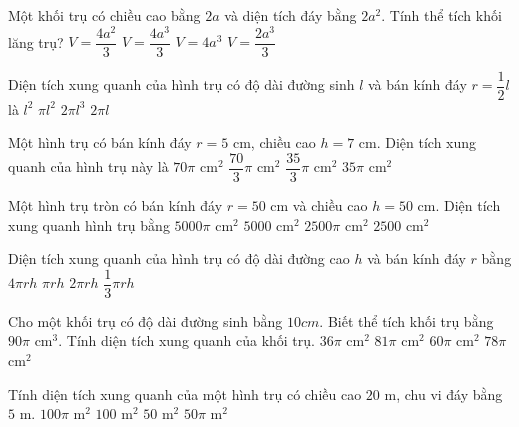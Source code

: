 \begin{ex}%
	Một khối trụ có chiều cao bằng $2a$ và diện tích đáy bằng $2a^2$. Tính thể tích khối lăng trụ?
	\choice
	{$V=\dfrac{4a^2}{3}$}
	{$V=\dfrac{4a^3}{3}$}
	{\True $V=4a^3$}
	{$V=\dfrac{2a^3}{3}$}
\end{ex}
\begin{ex}%
	Diện tích xung quanh của hình trụ có độ dài đường sinh $l$ và bán kính đáy $r=\dfrac{1}{2}l$ là
	\choice
	{$l^2$}
	{\True $\pi l^2$}
	{$2\pi l^3$}
	{$2\pi l$}
\end{ex}
\begin{ex}%
	Một hình trụ có bán kính đáy $r=5$ cm, chiều cao $h=7$ cm. Diện tích xung quanh của hình trụ này là
	\choice
	{\True $70\pi$ cm$^2$}
	{$\dfrac{70}{3}\pi$ cm$^2$}
	{$\dfrac{35}{3}\pi$ cm$^2$}
	{$35\pi$ cm$^2$}
\end{ex}
\begin{ex}%
	Một hình trụ tròn có bán kính đáy $r=50$ cm và chiều cao $h=50$ cm. Diện tích xung quanh hình trụ bằng
	\choice
	{\True $5000\pi$ cm$^2$}
	{$5000$ cm$^2$}
	{$2500\pi$ cm$^2$}
	{$2500$ cm$^2$}
\end{ex}
\begin{ex}%
	Diện tích xung quanh của hình trụ có độ dài đường cao $h$ và bán kính đáy $r$ bằng
	\choice
	{$4\pi rh$}
	{$\pi rh$}
	{\True $2\pi rh$}
	{$\dfrac{1}{3}\pi rh$}
\end{ex}
\begin{ex}%
	Cho một khối trụ có độ dài đường sinh bằng $10 cm$. Biết thể tích khối trụ bằng $90\pi$  cm$^3$. Tính diện tích xung quanh của khối trụ. 
	\choice
	{$36\pi$ cm$^2$}
	{$81\pi$ cm$^2$}
	{\True $60\pi$ cm$^2$}
	{$78\pi$ cm$^2$}
\end{ex}
\begin{ex}%
	Tính diện tích xung quanh của một hình trụ có chiều cao $20$ m, chu vi đáy bằng $5$ m. 
	\choice
	{$100\pi$ m$^2$}
	{\True $100$ m$^2$}
	{$50$ m$^2$}
	{$50\pi$ m$^2$}
\end{ex}
